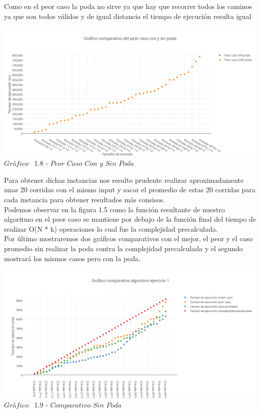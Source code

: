 Como en el peor caso la poda no sirve ya que hay que recorrer todos los caminos ya que son todos v\'alidos y de igual distancia el tiempo de ejecuci\'on resulta igual

\vspace*{0.3cm} \vspace*{0.3cm}
  \begin{center}
 \includegraphics[scale=0.65]{./EJ1/peorcaso1.png}
 {$Gr$\'a$fico$ \ 1.8 - $Peor$ $Caso$ $Con$ $y$ $Sin$ $Poda$}
  \end{center}
   \vspace*{0.3cm}
  
 Para obtener dichas instancias nos resulto prudente realizar aproximadamente unas 20 corridas con el mismo input y sacar el promedio de estas 20 corridas para cada instancia para obtener resultados m\'as consisos.\\ 

Podemos observar en la figura 1.5 como la funci\'on resultante de nuestro algoritmo en el peor caso se mantiene por debajo de la funci\'on final del tiempo de realizar O(N * k) operaciones lo cual fue la complejidad precalculada.\\

Por \'ultimo mostraremos dos gr\'aficos comparativos con el mejor, el peor y el caso promedio sin realizar la poda contra la complejidad precalculada y el segundo mostrar\'a los mismos casos pero con la poda.\\

\vspace*{0.3cm} \vspace*{0.3cm}
  \begin{center}
\includegraphics[scale=0.65]{./EJ1/comparativo.png}
{$Gr$\'a$fico$ \ 1.9 - $Comparativo$ $Sin$ $Poda$}
  \end{center}
  \vspace*{0.3cm}
  
